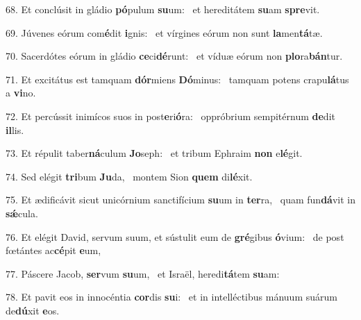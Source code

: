 68. Et conclúsit in gládio \textbf{pó}pulum \textbf{su}um: \ast\  et hereditátem \textbf{su}am \textbf{spre}vit.\

69. Júvenes eórum com\textbf{é}dit \textbf{i}gnis: \ast\  et vírgines eórum non sunt \textbf{la}men\textbf{tá}tæ.\

70. Sacerdótes eórum in gládio \textbf{ce}ci\textbf{dé}runt: \ast\  et víduæ eórum non \textbf{plo}ra\textbf{bán}tur.\

71. Et excitátus est tamquam \textbf{dór}miens \textbf{Dó}minus: \ast\  tamquam potens crapu\textbf{lá}tus a \textbf{vi}no.\

72. Et percússit inimícos suos in post\textbf{e}ri\textbf{ó}ra: \ast\  oppróbrium sempitérnum \textbf{de}dit \textbf{il}lis.\

73. Et répulit taber\textbf{ná}culum \textbf{Jo}seph: \ast\  et tribum Ephraim \textbf{non} e\textbf{lé}git.\

74. Sed elégit \textbf{tri}bum \textbf{Ju}da, \ast\  montem Sion \textbf{quem} di\textbf{lé}xit.\

75. Et ædificávit sicut unicórnium sanctifícium \textbf{su}um in \textbf{ter}ra, \ast\  quam fun\textbf{dá}vit in \textbf{sǽ}cula.\

76. Et elégit David, servum suum, et sústulit eum de \textbf{gré}gibus \textbf{ó}vium: \ast\  de post fœtántes ac\textbf{cé}pit \textbf{e}um,\

77. Páscere Jacob, \textbf{ser}vum \textbf{su}um, \ast\  et Israël, heredi\textbf{tá}tem \textbf{su}am:\

78. Et pavit eos in innocéntia \textbf{cor}dis \textbf{su}i: \ast\  et in intelléctibus mánuum suárum de\textbf{dú}xit \textbf{e}os.\

